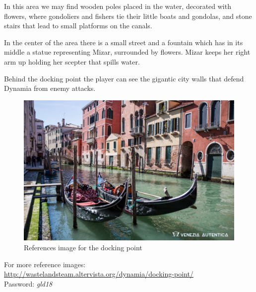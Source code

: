 In this area we may find wooden poles placed in the water, decorated with flowers, where gondoliers and fishers tie their little boats and gondolas, and  stone stairs that lead to small platforms on the canals.

In the center of the area there is a small street and a fountain which has in its middle a statue representing Mizar, surrounded by flowers. Mizar keeps her right arm up holding her scepter that spills water.

Behind the docking point the player can see the gigantic city walls that defend Dynamia from enemy attacks.

\begin{figure}[H]
  \centering
  \includegraphics[width=\textwidth]{Images/Landmarks/dockingPoint}
  \caption{References image for the docking point}
\end{figure}
For more reference images: \url{http://wastelandsteam.altervista.org/dynamia/docking-point/}\\
Password: \textit{gld18}
